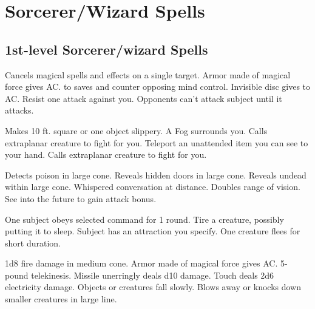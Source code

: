\section{Sorcerer/Wizard Spells}
\subsection{1st-level Sorcerer/wizard Spells}
\begin{swspelllist}
 Cancels magical spells and effects on a single target.
 Armor made of magical force gives  AC.
  to saves and counter opposing mind control.
 Invisible disc gives  to AC.
 Resist one attack against you.
 Opponents can't attack subject until it attacks.

 Makes 10 ft. square or one object slippery.
 A Fog surrounds you.
 Calls extraplanar creature to fight for you.
 Teleport an unattended item you can see to your hand.
 Calls extraplanar creature to fight for you.

 Detects poison in large cone.
 Reveals hidden doors in large cone.
 Reveals undead within large cone.
 Whispered conversation at distance.
 Doubles range of vision.
 See into the future to gain attack bonus.

 One subject obeys selected command for 1 round.
 Tire a creature, possibly putting it to sleep.
 Subject has an attraction you specify.
 One creature flees for short duration.

 1d8 fire damage in medium cone.
 Armor made of magical force gives  AC.
 5-pound telekinesis.
 Missile unerringly deals d10 damage.
 Touch deals 2d6 electricity damage.
 Objects or creatures fall slowly.
 Blows away or knocks down smaller creatures in large line.


\end{swspelllist}
